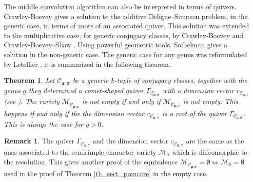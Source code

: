 \documentclass[JEP,XML,SOM,NoEqCountersInSection,Unicode,published]{cedram}
\theoremstyle{definition}
\newtheorem{remark}[definition]{Remark}
\theoremstyle{plain}
\newtheorem{theorem}[definition]{Theorem}
\newcommand{\mcmus}{\mathcal{M}_{\overline{\mathcal{C}}_{\boldsymbol{\mu},\boldsymbol{\sigma}}}}
\newcommand{\cmus}{\mathcal{C}_{\boldsymbol{\mu},\boldsymbol{\sigma}}}
\begin{document}
The middle convolution algorithm can also be interpreted in terms of quivers. Crawley-Boevey \cite{Crawley-Boevey2003} gives a solution to the additive Deligne--Simpson problem, in the generic case, in terms of roots of an associated quiver. This solution was extended to the multiplicative case, for generic conjugacy classes, by Crawley-Boevey \cite[Th.\,8.3]{Crawley-Boevey_parabolic} and Crawley-Boevey--Shaw \cite{Crawley-Boevey_Shaw}. Using powerful geometric tools, Soibelman \cite{Soibelman16,Soibelman18} gives a solution in the non-generic case.
The generic case for any genus was reformulated by Letellier \cite[Th.\,4.1.7]{Letellier_gl} \cite[Cor.\,3.15]{Letellier13}, it is summarized in the following theorem.
\begin{theorem}
Let $\mathcal{C}_{\boldsymbol{\mu},\boldsymbol{\sigma}}$ be a generic $k$-tuple of conjugacy classes, together with the genus $g$ they determined a comet-shaped quiver $\Gamma_{\cmus}$ with a dimension vector $v_{\cmus}$ (see \cite[\S 3.2]{Letellier13}). The variety $\mathcal{M}_{\overline{\mathcal{C}}_{\boldsymbol{\mu},\boldsymbol{\sigma}}}$ is not empty if and only if $\mathcal{M}_{\mathcal{C}_{\boldsymbol{\mu},\boldsymbol{\sigma}}}$ is not empty. This happens if and only if the the dimension vector $v_{\mathcal{C}_{\boldsymbol{\mu},\boldsymbol{\sigma}}}$ is a root of the quiver $\Gamma_{\mathcal{C}_{\boldsymbol{\mu},\boldsymbol{\sigma}}}$. This is always the case for $g>0$.
\end{theorem}
\begin{remark}
The quiver $\Gamma_{\cmus}$ and the dimension vector $v_{\cmus}$ are the same as the ones associated to the semisimple character variety $\mathcal{M}_{\boldsymbol{\mathcal{S}}}$ which is diffeomorphic to the resolution. This gives another proof of the equivalence $\mcmus = \emptyset \Leftrightarrow \mathcal{M}_{\boldsymbol{\mathcal{S}}} = \emptyset$ used in the proof of Theorem \ref{th_sect_poincare} in the empty case.
\end{remark}

\label{subsect_twisted_poincare}
\end{document}
